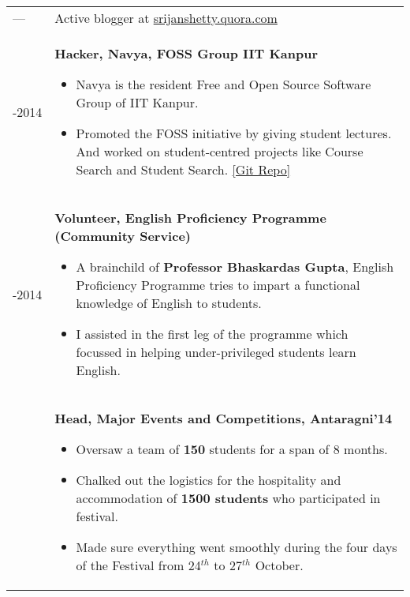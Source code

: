 \documentclass[a4paper,10pt]{article} %
\begin{document}
\begin{tabular}{>{\raggedleft}p{2.2cm}p{15cm}}

    ---   & Active blogger at \href{srijanshetty.quora.com} {srijanshetty.quora.com} \\

    2013-2014    & \textbf{Hacker, Navya, FOSS Group IIT Kanpur}
                   \footnotesize{
                       \begin{itemize}[leftmargin=*]
                           \item Navya is the resident Free and Open Source Software Group of IIT Kanpur.
                           \item Promoted the FOSS initiative by giving student lectures.
                               And worked on student-centred projects like Course Search and Student Search.
                               \href{https://github.com/navya} {[Git Repo]}
                       \end{itemize}
                   }\\

                   2013-2014    & \textbf{Volunteer, English Proficiency Programme (Community Service)}
                   \footnotesize{
                       \begin{itemize}[leftmargin=*]
                           \item A brainchild of \textbf{Professor Bhaskardas Gupta}, English Proficiency
                               Programme tries to impart a functional knowledge of English to students.
                           \item I assisted in the first leg of the programme which focussed in helping
                               under-privileged students learn English.
                       \end{itemize}
                   }\\

    2014 & \textbf{Head, Major Events and Competitions, Antaragni'14}
           \footnotesize{
               \begin{itemize}[leftmargin=*]
                   \item Oversaw a team of \textbf{150} students for a span of 8 months.
                   \item Chalked out the logistics for the hospitality and accommodation of \textbf{1500 students} who
                       participated in festival.
                   \item Made sure everything went smoothly during the four days of the Festival from 24$^{th}$
                       to 27$^{th}$ October.
               \end{itemize}
           }\\


\end{tabular}
\end{document}
